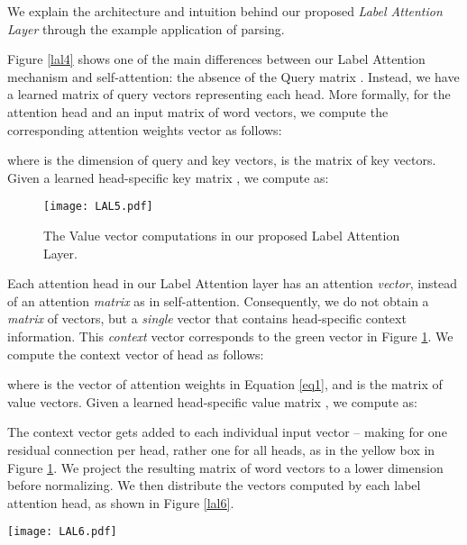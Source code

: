 \documentclass[11pt,a4paper]{article}
\begin{document}
We explain the architecture and intuition behind our proposed \textit{Label Attention Layer} through the example application of parsing.

Figure \ref{lal4} shows one of the main differences between our Label Attention mechanism and self-attention: the absence of the Query matrix . Instead, we have a learned matrix  of query vectors representing each head. More formally, for the attention head  and an input matrix  of word vectors, we compute the corresponding attention weights vector  as follows:



\noindent where  is the dimension of query and key vectors,  is the matrix of key vectors. Given a learned head-specific key matrix , we compute  as:



\begin{figure}
    \centering
    \texttt{[image: LAL5.pdf]}
    \caption{The Value vector computations in our proposed Label Attention Layer.}
    \label{lal5}
\end{figure}

Each attention head in our Label Attention layer has an attention \textit{vector}, instead of an attention \textit{matrix} as in self-attention. Consequently, we do not obtain a \textit{matrix} of vectors, but a \textit{single} vector that contains head-specific context information. This \textit{context} vector corresponds to the green vector in Figure \ref{lal5}. We compute the context vector  of head  as follows:



\noindent where  is the vector of attention weights in Equation \ref{eq1}, and  is the matrix of value vectors. Given a learned head-specific value matrix , we compute  as:



The context vector gets added to each individual input vector – making for one residual connection per head, rather one for all heads, as in the yellow box in Figure \ref{lal5}. We project the resulting matrix of word vectors to a lower dimension before normalizing. We then distribute the vectors computed by each label attention head, as shown in Figure \ref{lal6}.

\begin{figure*}
    \centering
    \texttt{[image: LAL6.pdf]}
    \caption{Redistribution of the head-specific word representations to form word vectors by concatenation. We use different colors for each label attention head. The colors show where the head outputs go in the word representations. We do not use colors for the vectors resulting from the position-wise feed-forward layer, as the head-specific information moved.}
    \label{lal6}
\end{figure*}
\end{document}
